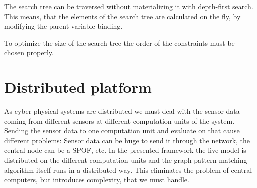 The search tree can be traversed without materializing it with depth-first search. This means, that the elements of the search tree are calculated on the fly, by modifying the parent variable binding.

To optimize the size of the search tree the order of the constraints must be chosen properly. 

\section{Distributed platform}


As cyber-physical systems are distributed we must deal with the sensor data coming from different sensors at different computation units of the system. Sending the sensor data to one computation unit and evaluate on that cause different problems: Sensor data can be huge to send it through the network, the central node can be a SPOF, etc. In the presented framework the live model is distributed on the different computation units and the graph pattern matching algorithm itself runs in a distributed way. This eliminates the problem of central computers, but introduces complexity, that we must handle. 








